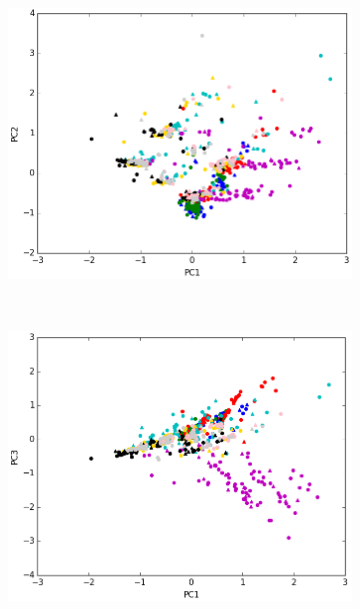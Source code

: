 \begin{figure}[ht!]	
	\begin{subfigure}[b]{0.5\textwidth}
		\includegraphics[width=\linewidth]{img/sanger/3dim-pc1-pc2.png}
	\end{subfigure}%
	~
	\begin{subfigure}[b]{0.5\textwidth}
		\includegraphics[width=\linewidth]{img/sanger/3dim-pc1-pc3.png}
	\end{subfigure}%

\end{figure}

